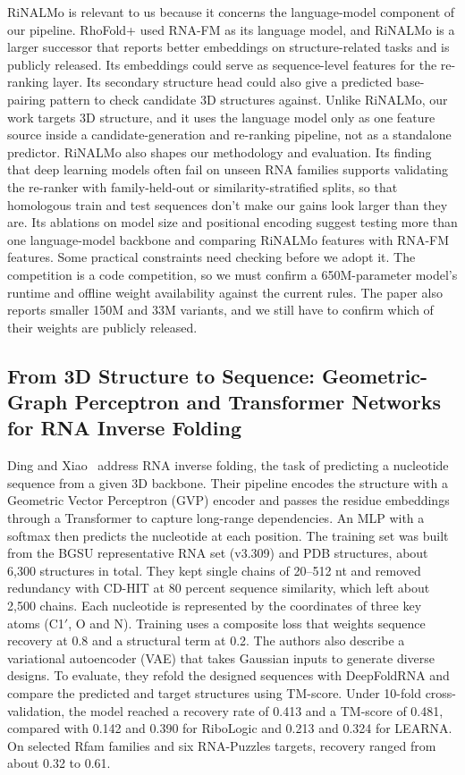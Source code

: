 \documentclass{FastFyp}
\begin{document}
RiNALMo is relevant to us because it concerns the language-model component of our pipeline. RhoFold+ used RNA-FM as its language model, and RiNALMo is a larger successor that reports better embeddings on structure-related tasks and is publicly released. Its embeddings could serve as sequence-level features for the re-ranking layer. Its secondary structure head could also give a predicted base-pairing pattern to check candidate 3D structures against. Unlike RiNALMo, our work targets 3D structure, and it uses the language model only as one feature source inside a candidate-generation and re-ranking pipeline, not as a standalone predictor. RiNALMo also shapes our methodology and evaluation. Its finding that deep learning models often fail on unseen RNA families supports validating the re-ranker with family-held-out or similarity-stratified splits, so that homologous train and test sequences don't make our gains look larger than they are. Its ablations on model size and positional encoding suggest testing more than one language-model backbone and comparing RiNALMo features with RNA-FM features. Some practical constraints need checking before we adopt it. The competition is a code competition, so we must confirm a 650M-parameter model's runtime and offline weight availability against the current rules. The paper also reports smaller 150M and 33M variants, and we still have to confirm which of their weights are publicly released.

\subsection{From 3D Structure to Sequence: Geometric-Graph Perceptron and Transformer Networks for RNA Inverse Folding}
Ding and Xiao~\cite{ding2025inverse} address RNA inverse folding, the task of predicting a nucleotide sequence from a given 3D backbone. Their pipeline encodes the structure with a Geometric Vector Perceptron (GVP) encoder and passes the residue embeddings through a Transformer to capture long-range dependencies. An MLP with a softmax then predicts the nucleotide at each position. The training set was built from the BGSU representative RNA set (v3.309) and PDB structures, about 6,300 structures in total. They kept single chains of 20--512 nt and removed redundancy with CD-HIT at 80 percent sequence similarity, which left about 2,500 chains. Each nucleotide is represented by the coordinates of three key atoms (C1$'$, O and N). Training uses a composite loss that weights sequence recovery at 0.8 and a structural term at 0.2. The authors also describe a variational autoencoder (VAE) that takes Gaussian inputs to generate diverse designs. To evaluate, they refold the designed sequences with DeepFoldRNA and compare the predicted and target structures using TM-score. Under 10-fold cross-validation, the model reached a recovery rate of 0.413 and a TM-score of 0.481, compared with 0.142 and 0.390 for RiboLogic and 0.213 and 0.324 for LEARNA. On selected Rfam families and six RNA-Puzzles targets, recovery ranged from about 0.32 to 0.61.
\end{document}
